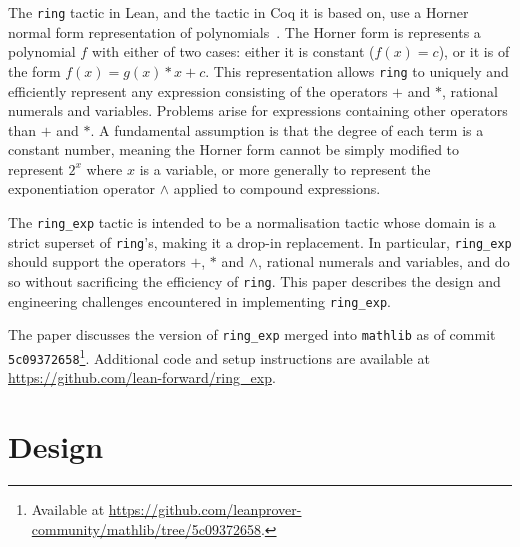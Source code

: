 \documentclass{llncs}
\newcommand{\Q}{\mathbb{Q}}
\newcommand{\lean}[1]{\texttt{#1}\xspace} %
\newcommand{\pow}{$\wedge$\xspace}
\newcommand{\ringexp}{\lean{ring\_exp}}
\begin{document}
The \lean{ring} tactic in Lean, and the tactic in Coq it is based on,
use a Horner normal form representation of polynomials~\cite{ring-tactic}.
The Horner form is represents a polynomial $f$ with either of two cases:
either it is constant ($f(x) = c$), or it is of the form $f(x) = g(x) * x + c$.
This representation
allows \lean{ring} to uniquely and efficiently represent any expression consisting of the operators $+$ and $*$, rational numerals and variables.
Problems arise for expressions containing other operators than $+$ and $*$. %
A fundamental assumption is that the degree of each term is a constant number,
meaning the Horner form cannot be simply modified to represent $2^x$ where $x$ is a variable,
or more generally to represent the exponentiation operator \pow applied to compound expressions.


The \ringexp tactic is intended to be a normalisation tactic whose domain is a strict superset of \lean{ring}'s,
making it a drop-in replacement.
In particular, \ringexp should support the operators $+$, $*$ and \pow, rational numerals and variables,
and do so without sacrificing the efficiency of \lean{ring}.
This paper describes the design and engineering challenges encountered in implementing \ringexp.

The paper discusses the version of \ringexp merged into \texttt{mathlib} as of commit \texttt{5c09372658}\footnote{Available at \url{https://github.com/leanprover-community/mathlib/tree/5c09372658}.}.
Additional code and setup instructions are available at \url{https://github.com/lean-forward/ring_exp}.

\section{Design}
\end{document}

